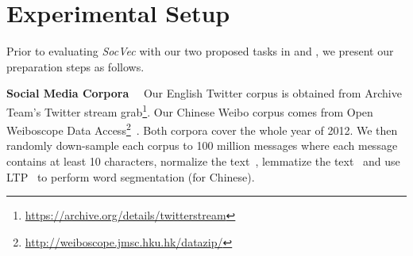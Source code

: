 %

\section{Experimental Setup}
\label{sec:prelim}
Prior to evaluating \textit{SocVec} with our two proposed tasks in  and , we present our preparation steps as follows. 

\textbf{Social Media Corpora}~~
Our English Twitter corpus is obtained from Archive Team's Twitter stream 
grab\footnote{\scriptsize{\url{https://archive.org/details/twitterstream}}}.
Our Chinese Weibo corpus comes from Open Weiboscope Data Access\footnote{\scriptsize{\url{http://weiboscope.jmsc.hku.hk/datazip/}}}~\cite{fu2013assessing}.
Both corpora cover the whole year of {2012}.
We then randomly down-sample each corpus to 100 million messages where
each message contains at least 10 characters, normalize the text~\cite{han2012automatically}, 
lemmatize the text~\cite{manning2014stanford} and use LTP~\cite{che2010ltp} to perform word segmentation (for Chinese).

